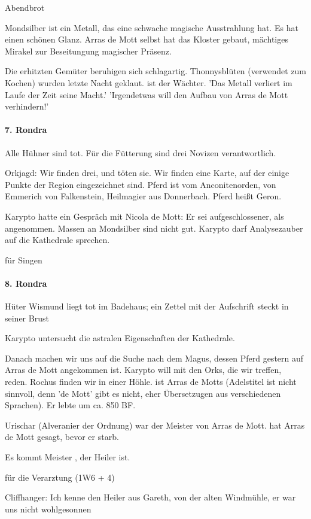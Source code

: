 Abendbrot

Mondsilber ist ein Metall, das eine schwache magische Ausstrahlung hat. Es hat einen schönen Glanz. Arras de Mott selbst hat das Kloster gebaut, mächtiges Mirakel zur Beseitungung magischer Präsenz.

Die erhitzten Gemüter beruhigen sich schlagartig. Thonnysblüten (verwendet zum Kochen) wurden letzte Nacht geklaut.  ist der Wächter. 'Das Metall verliert im Laufe der Zeit seine Macht.'
'Irgendetwas will den Aufbau von Arras de Mott verhindern!'

\paragraph{7. Rondra}
Alle Hühner sind tot. Für die Fütterung sind drei Novizen verantwortlich. 

Orkjagd: Wir finden drei, und töten sie. Wir finden eine Karte, auf der einige Punkte der Region eingezeichnet sind. Pferd ist vom Anconitenorden, von Emmerich von Falkenstein, Heilmagier aus Donnerbach. Pferd heißt Geron.

Karypto hatte ein Gespräch mit Nicola de Mott: Er sei aufgeschlossener, als angenommen. Massen an Mondsilber sind nicht gut. Karypto darf Analysezauber auf die Kathedrale sprechen. 

 für Singen

\paragraph{8. Rondra}
Hüter Wismund liegt tot im Badehaus; ein Zettel mit der Aufschrift  steckt in seiner Brust

Karypto untersucht die astralen Eigenschaften der Kathedrale. 

Danach machen wir uns auf die Suche nach dem Magus, dessen Pferd gestern auf Arras de Mott angekommen ist. Karypto will mit den Orks, die wir treffen, reden. Rochus finden wir in einer Höhle.  ist Arras de Motts (Adelstitel ist nicht sinnvoll, denn 'de Mott' gibt es nicht, eher Übersetzugen aus verschiedenen Sprachen). Er lebte um ca. 850 BF.

Urischar (Alveranier der Ordnung) war der Meister von Arras de Mott.
hat Arras de Mott gesagt, bevor er starb.

Es kommt Meister , der Heiler ist. 

 für die Verarztung (1W6 + 4)

Cliffhanger: Ich kenne den Heiler aus Gareth, von der alten Windmühle, er war uns nicht wohlgesonnen


